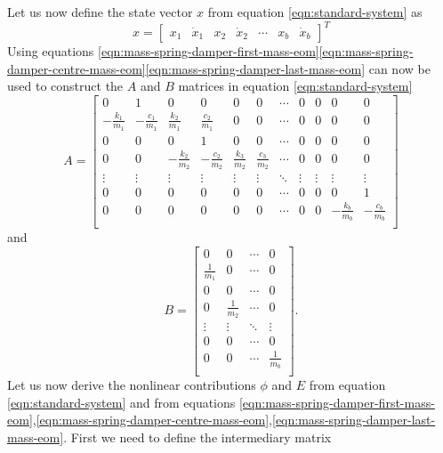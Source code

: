 Let us now define the state vector $x$ from equation \eqref{eqn:standard-system} as
\begin{equation}\label{eqn:msd-x}
    x =
    \begin{bmatrix}
        x_1 & \dot{x}_1 & x_2 & \dot{x}_2 & \cdots & x_b & \dot{x}_{b}
    \end{bmatrix}^T
\end{equation}
Using equations \eqref{eqn:mass-spring-damper-first-mass-eom}\eqref{eqn:mass-spring-damper-centre-mass-eom}\eqref{eqn:mass-spring-damper-last-mass-eom} can now be used to construct the $A$ and $B$ matrices in equation \eqref{eqn:standard-system}
\begin{equation}\label{eqn:msd-A}
    A =
    \begin{bmatrix}
        0 & 1 & 0 & 0 & 0 & 0 & \cdots & 0 & 0 & 0 & 0 \\
        -\frac{k_1}{m_1} & -\frac{c_1}{m_1} & \frac{k_2}{m_1} & \frac{c_2}{m_1} & 0 & 0 & \cdots & 0 & 0 & 0 & 0 \\
        0 & 0 & 0 & 1 & 0 & 0 & \cdots & 0 & 0 & 0 & 0 \\
       0 & 0 & -\frac{k_2}{m_2} & -\frac{c_2}{m_2} & \frac{k_3}{m_2} & \frac{c_3}{m_2} & \cdots & 0 & 0 & 0 & 0 \\
        \vdots & \vdots & \vdots & \vdots & \vdots & \vdots & \ddots & \vdots & \vdots & \vdots & \vdots \\
        0 & 0 & 0 & 0 & 0 & 0 & \cdots & 0 & 0 & 0 & 1 \\
        0 & 0 & 0 & 0 & 0 & 0 & \cdots & 0 & 0 & -\frac{k_b}{m_b} & -\frac{c_b}{m_b} \\
    \end{bmatrix}
\end{equation}
and
\begin{equation}\label{eqn:msd-B}
    B = 
    \begin{bmatrix}
        0 & 0 & \cdots & 0 \\
        \frac{1}{m_1} & 0 & \cdots & 0 \\
        0 & 0 & \cdots & 0 \\
        0 & \frac{1}{m_2} & \cdots & 0 \\
        \vdots & \vdots & \ddots & \vdots \\
        0 & 0 & \cdots & 0 \\
        0 & 0 & \cdots & \frac{1}{m_b} \\
    \end{bmatrix}.
\end{equation}
Let us now derive the nonlinear contributions $\phi$ and $E$ from equation \eqref{eqn:standard-system} and from equations \eqref{eqn:mass-spring-damper-first-mass-eom},\eqref{eqn:mass-spring-damper-centre-mass-eom},\eqref{eqn:mass-spring-damper-last-mass-eom}. First we need to define the intermediary matrix

